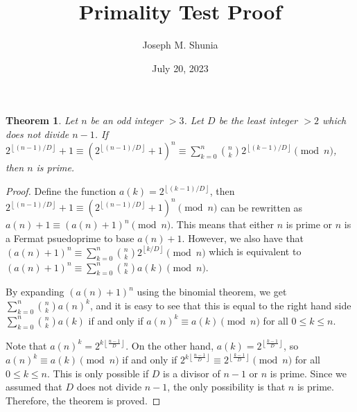 \documentclass{article}
\title{Primality Test Proof}
\author{Joseph M. Shunia}
\date{July 20, 2023}
\begin{document}
\maketitle
\newtheorem{theorem}{Theorem}
\begin{theorem}
Let $n$ be an odd integer $>3$.
Let $D$ be the least integer $>2$ which does not divide $n-1$.
If $2^{\left\lfloor (n-1)/D \right\rfloor} + 1 \equiv (2^{\left\lfloor (n-1)/D \right\rfloor} + 1)^{n} \equiv \sum_{k=0}^{n} \binom{n}{k}2^{\left\lfloor (k-1)/D \right\rfloor} \pmod{n}$, then $n$ is prime.
\end{theorem}
\begin{proof}
Define the function $a(k) = 2^{\left\lfloor (k-1)/D \right\rfloor}$, then $2^{\left\lfloor (n-1)/D \right\rfloor} + 1 \equiv (2^{\left\lfloor (n-1)/D \right\rfloor} + 1)^{n} \pmod{n}$ can be rewritten as $a(n) + 1 \equiv (a(n) + 1)^{n} \pmod{n}$. This means that either $n$ is prime or $n$ is a Fermat psuedoprime to base $a(n) + 1$. However, we also have that $(a(n) + 1)^{n} \equiv \sum_{k=0}^{n} \binom{n}{k}2^{\left\lfloor k/D \right\rfloor} \pmod{n}$
which is equivalent to $(a(n) + 1)^{n} \equiv \sum_{k=0}^{n} \binom{n}{k}a(k) \pmod{n}$.

By expanding $(a(n) + 1)^{n}$ using the binomial theorem, we get $\sum_{k=0}^{n} \binom{n}{k}a(n)^k$, and it is easy to see that this is equal to the right hand side $\sum_{k=0}^{n} \binom{n}{k}a(k)$ if and only if $a(n)^k \equiv a(k) \pmod{n}$ for all $0 \leq k \leq n$.

Note that $a(n)^k = 2^{k \left\lfloor \frac{n-1}{D} \right\rfloor}$. On the other hand, $a(k) = 2^{\left\lfloor \frac{k-1}{D} \right\rfloor}$, so $a(n)^k \equiv a(k) \pmod{n}$ if and only if $2^{k \left\lfloor \frac{n-1}{D} \right\rfloor} \equiv 2^{\left\lfloor \frac{k-1}{D} \right\rfloor} \pmod{n}$ for all $0 \leq k \leq n$. This is only possible if $D$ is a divisor of $n-1$ or $n$ is prime. Since we assumed that $D$ does not divide $n-1$, the only possibility is that $n$ is prime. Therefore, the theorem is proved.
\end{proof}
\end{document}

